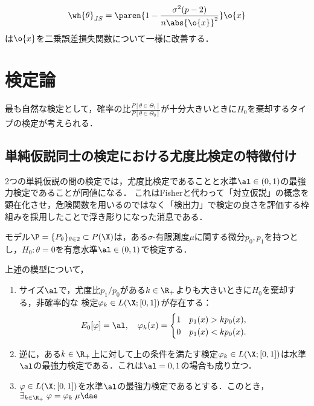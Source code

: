 \documentclass[uplatex,dvipdfmx]{jsreport}
\begin{document}
\begin{theorem}
    \[\wh{\theta}_{JS}=\paren{1-\frac{\sigma^2(p-2)}{n\abs{\o{x}}^2}}\o{x}\]
    は$\o{x}$を二乗誤差損失関数について一様に改善する．
\end{theorem}

\section{検定論}

\begin{tcolorbox}[colframe=ForestGreen, colback=ForestGreen!10!white,breakable,colbacktitle=ForestGreen!40!white,coltitle=black,fonttitle=\bfseries\sffamily,
title=]
    最も自然な検定として，確率の比$\frac{P[\theta\in\Theta_1]}{P[\theta\in\Theta_0]}$が十分大きいときに$H_0$を棄却するタイプの検定が考えられる．
\end{tcolorbox}

\subsection{単純仮説同士の検定における尤度比検定の特徴付け}

\begin{tcolorbox}[colframe=ForestGreen, colback=ForestGreen!10!white,breakable,colbacktitle=ForestGreen!40!white,coltitle=black,fonttitle=\bfseries\sffamily,
title=]
    2つの単純仮説の間の検定では，尤度比検定であることと水準$\al\in(0,1)$の最強力検定であることが同値になる．
    これはFisherと代わって「対立仮説」の概念を顕在化させ，危険関数を用いるのではなく「検出力」で検定の良さを評価する枠組みを採用したことで浮き彫りになった消息である．
\end{tcolorbox}

\begin{model}[単純仮説同士の検定]
    モデル$\P=\{P_\theta\}_{\theta\in2}\subset P(\X)$は，ある$\sigma$-有限測度$\mu$に関する微分$p_0,p_1$を持つとし，$H_0:\theta=0$を有意水準$\al\in(0,1)$で検定する．
\end{model}

\begin{theorem}\label{thm-Neyman-Pearson}
    上述の模型について，
    \begin{enumerate}
        \item サイズ$\al$で，尤度比$p_1/p_0$がある$k\in\R_+$よりも大きいときに$H_0$を棄却する，非確率的な
        検定$\varphi_k\in L(\X;[0,1])$が存在する：
        \[E_0[\varphi]=\al,\quad\varphi_k(x)=\begin{cases}
            1&p_1(x)>kp_0(x),\\
            0&p_1(x)<kp_0(x).
        \end{cases}\]
        \item 逆に，ある$k\in\R_+$上に対して上の条件を満たす検定$\varphi_k\in L(\X;[0,1])$は水準$\al$の最強力検定である．これは$\al=0,1$の場合も成り立つ．
        \item $\varphi\in L(\X;[0,1])$を水準$\al$の最強力検定であるとする．このとき，$\exists_{k\in\R_+}\;\varphi=\varphi_k\;\mu\dae$
    \end{enumerate}
\end{theorem}
\end{document}
